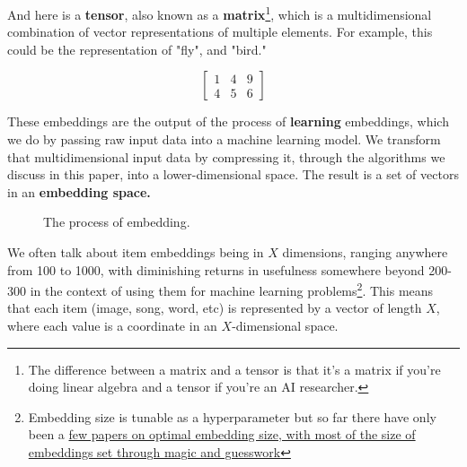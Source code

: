 \documentclass[11pt, table]{diazessay} %
\begin{document}
\begin{sloppypar}
And here is a \textbf{tensor}, also known as a \textbf{matrix}\footnote{The difference between a matrix and a tensor is that it's a matrix if you're doing linear algebra and a tensor if you're an AI researcher.}, which is a multidimensional combination of vector representations of multiple elements. For example, this could be the representation of "fly", and "bird."

\begin{equation}
\begin{bmatrix}
1 & 4 & 9\\
4 & 5 & 6
\end{bmatrix}
\end{equation}

These embeddings are the output of the process of \textbf{learning} embeddings, which we do by passing raw input data into a machine learning model. We transform that multidimensional input data by compressing it, through the algorithms we discuss in this paper, into a lower-dimensional space. The result is a set of vectors in an \textbf{embedding space.}  

\begin{figure}[H]
    \centering
    \caption{The process of embedding.}
    \label{fig:embedding}
\end{figure}

We often talk about item embeddings being in $X$ dimensions, ranging anywhere from 100 to 1000, with diminishing returns in usefulness somewhere beyond 200-300 in the context of using them for machine learning problems\footnote{Embedding size is tunable as a hyperparameter but so far there have only been a \href{https://aclanthology.org/I17-2006.pdf}{few papers on optimal embedding size, with most of the size of embeddings set through magic and guesswork}}. This means that each item (image, song, word, etc) is represented by a vector of length $X$, where each value is a coordinate in an $X$-dimensional space.


\end{sloppypar}
\end{document}
